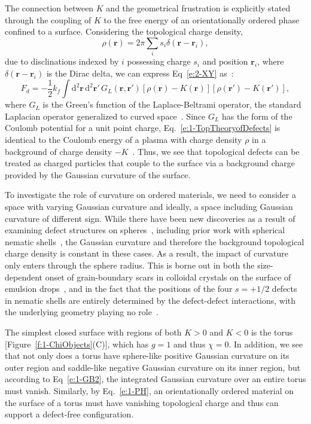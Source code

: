 The connection between $K$ and the geometrical frustration is explicitly stated through the coupling of $K$ to the free energy of an orientationally ordered phase confined to a surface.
Considering the topological charge density,
\begin{equation}
  \rho(\mathbf{r}) = 2 \pi \sum\limits_i s_{i}\delta(\mathbf{r} - \mathbf{r}_{i}),\label{e:1-ChargeDens}
\end{equation}
due to disclinations indexed by $i$ possessing charge $s_{i}$ and position $\mathbf{r}_{i}$, where $\delta(\mathbf{r} - \mathbf{r}_{i})$ is the Dirac delta, we can express Eq~\ref{e:2-XY} as~\cite{RN42,RN175,RN17}:
\begin{equation}
  F_d = -\frac{1}{2} k_f \int \textrm{d}^2\mathbf{r} \, \textrm{d}^2\mathbf{r}' \, G_L(\mathbf{r},\mathbf{r}') [\rho(\mathbf{r})-K(\mathbf{r})] [\rho(\mathbf{r}')-K(\mathbf{r}')],\label{e:1-TopTheoryofDefects}
\end{equation}
where $G_L$ is the Green's function of the Laplace-Beltrami operator, the standard Laplacian operator generalized to curved space~\cite{RN17}.
Since $G_L$ has the form of the Coulomb potential for a unit point charge, Eq.~\ref{e:1-TopTheoryofDefects} is identical to the Coulomb energy of a plasma with charge density $\rho$ in a background of charge density $-K$~\cite{RN17}.
Thus, we see that topological defects can be treated as charged particles that couple to the surface via a background charge provided by the Gaussian curvature of the surface.

To investigate the role of curvature on ordered materials, we need to consider a space with varying Gaussian curvature and ideally, a space including Gaussian curvature of different sign.
While there have been new discoveries as a result of examining defect structures on spheres~\cite{RN106,RN26,RN110,RN76,RN101,RN165}, including prior work with spherical nematic shells~\cite{RN45,RN105}, the Gaussian curvature and therefore the background topological charge density is constant in these cases.
As a result, the impact of curvature only enters through the sphere radius.
This is borne out in both the size-dependent onset of grain-boundary scars in colloidal crystals on the surface of emulsion drops~\cite{RN26,RN110}, and in the fact that the positions of the four $s = +1/2$ defects in nematic shells are entirely determined by the defect-defect interactions, with the underlying geometry playing no role~\cite{RN45}.

The simplest closed surface with regions of both $K>0$ and $K<0$ is the torus [Figure~\ref{f:1-ChiObjects}(C)], which has $g = 1$ and thus $\chi = 0$.
In addition, we see that not only does a torus have sphere-like positive Gaussian curvature on its outer region and saddle-like negative Gaussian curvature on its inner region, but according to Eq~\ref{e:1-GB2}, the integrated Gaussian curvature over an entire torus must vanish.
Similarly, by Eq.~\ref{e:1-PH}, an orientationally ordered material on the surface of a torus must have vanishing topological charge and thus can support a defect-free configuration.

